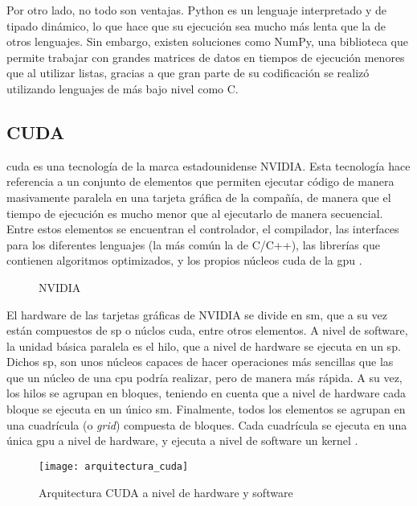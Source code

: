 			Por otro lado, no todo son ventajas. Python es un lenguaje interpretado y de tipado dinámico, lo que hace que su ejecución sea mucho más lenta que la de otros lenguajes. Sin embargo, existen soluciones como NumPy, una biblioteca que permite trabajar con grandes matrices de datos en tiempos de ejecución menores que al utilizar listas, gracias a que gran parte de su codificación se realizó utilizando lenguajes de más bajo nivel como C. 
		
		\subsection{CUDA}
		
			\gls{cuda} es una tecnología de la marca estadounidense NVIDIA. Esta tecnología hace referencia a un conjunto de elementos que permiten ejecutar código de manera masivamente paralela en una tarjeta gráfica de la compañía, de manera que el tiempo de ejecución es mucho menor que al ejecutarlo de manera secuencial. Entre estos elementos se encuentran el controlador, el compilador, las interfaces para los diferentes lenguajes (la más común la de C/C++), las librerías que contienen algoritmos optimizados, y los propios núcleos \gls{cuda} de la \gls{gpu} \cite{cuda}. \\
			
			\begin{figure}[!h]
				\centering
				
				\caption{NVIDIA}
				\label{fig:nvidia}
			\end{figure}
			
			El hardware de las tarjetas gráficas de NVIDIA se divide en \gls{sm}, que a su vez están compuestos de \gls{sp} o núclos \gls{cuda}, entre otros elementos. A nivel de software, la unidad básica paralela es el hilo, que a nivel de hardware se ejecuta en un \gls{sp}. Dichos \gls{sp}, son unos núcleos capaces de hacer operaciones más sencillas que las que un núcleo de una \gls{cpu} podría realizar, pero de manera más rápida. A su vez, los hilos se agrupan en bloques, teniendo en cuenta que a nivel de hardware cada bloque se ejecuta en un único \gls{sm}. Finalmente, todos los elementos se agrupan en una cuadrícula (o \textit{grid}) compuesta de bloques. Cada cuadrícula se ejecuta en una única \gls{gpu} a nivel de hardware, y ejecuta a nivel de software un kernel \cite{cuda_arq,cuda_arq1}. \\
			
			\begin{figure}[!h]
				\centering
				\texttt{[image: arquitectura\_cuda]}
				\caption{Arquitectura CUDA a nivel de hardware y software \cite{cuda_arq1}}
				\label{fig:arq_cuda}
			\end{figure}
			
